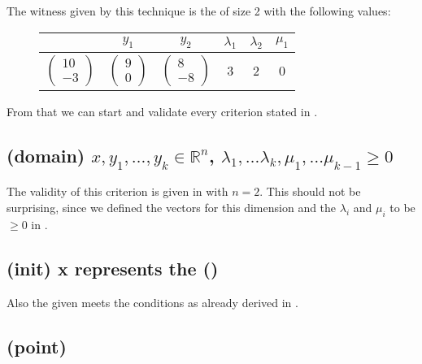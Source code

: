 The witness given by this technique is the \gna of size 2 with the following values:
\begin{figure}[H]
	\label{ex:gna}
	\centering
	\begin{tabular}{|c|c|c|c|c|c|}
		\hline
		\stem & $y_1$ & $y_2$ & $\lambda_1$ & $\lambda_2$ & $\mu_1$ \\ \hline
		$\begin{pmatrix} 10 \\ -3 \end{pmatrix}$ & $\begin{pmatrix} 9 \\ 0 \end{pmatrix}$ & $\begin{pmatrix} 8 \\ -8 \end{pmatrix}$ & 3 & 2 & 0 \\ \hline
	\end{tabular}
\end{figure}
From that we can start and validate every criterion stated in .

	\subsection[Verifying: domain criterion]{(domain)	$x, y_1, \dots, y_k \in \mathbb{R}^n$, $\lambda_1, \dots \lambda_k, \mu_1, \dots \mu_{k-1} \ge 0$ }
		The validity of this criterion is given in  with $n=2$. This should not be surprising, since we defined the vectors for this dimension and the $\lambda_i$ and $\mu_i$ to be $\ge 0$ in .
		
	\subsection[Verifying: init-criterion]{(init) x represents the \startterm (\stem)}
	Also the given \stem meets the conditions as already derived in .
	
	\newsavebox{\pointcrit}%
	\subsection[Verifying: point-criterion]{(point) \usebox{\pointcrit} }
	
